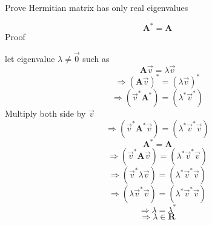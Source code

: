 \documentclass[10pt]{article}
\begin{document}
Prove Hermitian matrix has only real eigenvalues

$$\textbf{A}^\ast = \textbf{A}$$
Proof
 
let eigenvalue $\lambda \neq \vec{0}$ such as 
$$\textbf{A}\vec{v}  = \lambda\vec{v}$$
$$\Rightarrow (\textbf{A}\vec{v})^\ast = (\lambda\vec{v})^\ast$$
$$\Rightarrow (\vec{v}^\ast\textbf{A}^\ast)=(\lambda^\ast\vec{v}^\ast)$$
Multiply both side by $\vec{v}$$$\Rightarrow (\vec{v}^\ast\textbf{A}^\ast\vec{v})=(\lambda^\ast\vec{v}^\ast\vec{v})$$
$$\textbf{A}^\ast=\textbf{A}$$
$$\Rightarrow(\vec{v}^\ast\textbf{A}\vec{v})=(\lambda^\ast\vec{v}^\ast\vec{v})$$
$$\Rightarrow(\vec{v}^\ast\lambda\vec{v}) = (\lambda^\ast\vec{v}^\ast\vec{v})$$
$$\Rightarrow(\lambda\vec{v}^\ast\vec{v}) =  (\lambda^\ast\vec{v}^\ast\vec{v})$$
$$\Rightarrow \lambda = \lambda^\ast$$
$$\Rightarrow \lambda\in\mathbf{R}$$
\end{document}
